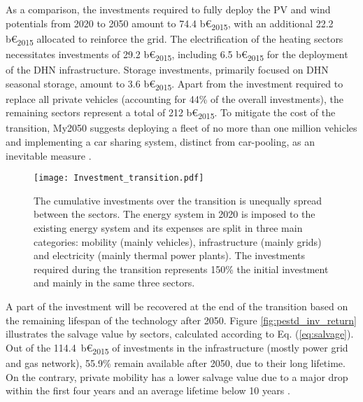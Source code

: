 As a comparison, the investments required to fully deploy the PV and wind potentials from 2020 to 2050 amount to 74.4 b€\textsubscript{2015}, with an additional 22.2 b€\textsubscript{2015} allocated to reinforce the grid. The electrification of the heating sectors necessitates investments of 29.2 b€\textsubscript{2015}, including 6.5 b€\textsubscript{2015} for the deployment of the \gls{DHN} infrastructure. Storage investments, primarily focused on \gls{DHN} seasonal storage, amount to 3.6 b€\textsubscript{2015}. Apart from the investment required to replace all private vehicles (accounting for 44\% of the overall investments), the remaining sectors represent a total of 212 b€\textsubscript{2015}. To mitigate the cost of the transition, My2050 suggests deploying a fleet of no more than one million vehicles and implementing a car sharing system, distinct from car-pooling, as an inevitable measure \cite{My2050}.



\begin{figure}[!htbp]
\centering
\texttt{[image: Investment\_transition.pdf]}
\caption{The cumulative investments over the transition is unequally spread between the sectors. The energy system in 2020 is imposed to the existing energy system and its expenses are split in three main categories: mobility (mainly vehicles), infrastructure (mainly grids) and electricity (mainly thermal power plants). The investments required during the transition represents 150\% the initial investment and mainly in the same three sectors. }
\label{fig:pestd_cumul_inv}
\end{figure}

A part of the investment will be recovered at the end of the transition based on the remaining lifespan of the technology after 2050. Figure \ref{fig:pestd_inv_return} illustrates the salvage value by sectors, calculated according to Eq. (\ref{eq:salvage}). Out of the 114.4~b€\textsubscript{2015} of investments in the infrastructure (\ie mostly power grid and gas network), 55.9\% remain available after 2050, due to their long lifetime. On the contrary, private mobility has a lower salvage value due to a major drop within the first four years and an average lifetime below 10 years \cite{febiac2021datadigest}. 


